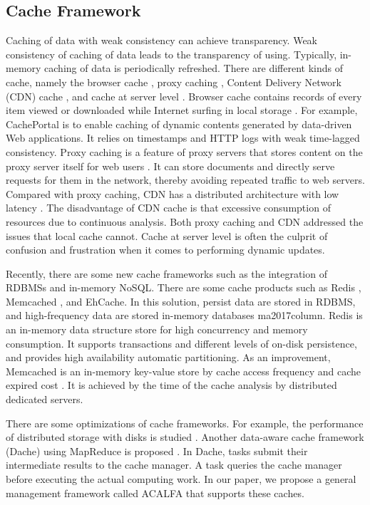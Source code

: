 \documentclass{singlecol-new}
\theoremstyle{TH}{
\newtheorem{lemma}{Lemma}
\newtheorem{theorem}[lemma]{Theorem}
\newtheorem{corrolary}[lemma]{Corrolary}
\newtheorem{conjecture}[lemma]{Conjecture}
\newtheorem{proposition}[lemma]{Proposition}
\newtheorem{claim}[lemma]{Claim}
\newtheorem{stheorem}[lemma]{Wrong Theorem}
}
\theoremstyle{THrm}{
\newtheorem{definition}{Definition}[section]
\newtheorem{question}{Question}[section]
\newtheorem{remark}{Remark}
\newtheorem{scheme}{Scheme}
}
\theoremstyle{THhit}{
\newtheorem{case}{Case}[section]
}
\begin{document}
\subsection{Cache Framework}
Caching of data with weak consistency can achieve transparency. Weak consistency of caching of data leads to the transparency of using. Typically, in-memory caching of data is periodically refreshed. There are different kinds of cache, namely the browser cache \cite{davison2001web}, proxy caching \cite{kumar2008new}, Content Delivery Network (CDN) cache \cite{vakali2003content}, and cache at server level \cite{ma2017column}. Browser cache contains records of every item viewed or downloaded while Internet surfing in local storage \cite{mookerjee2002analysis}. For example, CachePortal \cite{candan2001enabling} is to enable caching of dynamic contents generated by data-driven Web applications. It relies on timestamps and HTTP logs with weak time-lagged consistency. Proxy caching is a feature of proxy servers that stores content on the proxy server itself for web users \cite{kumar2008new}. It can store documents and directly serve requests for them in the network, thereby avoiding repeated traffic to web servers. Compared with proxy caching, CDN has a distributed architecture with low latency \cite{vakali2003content}. The disadvantage of CDN cache is that excessive consumption of resources due to continuous analysis. Both proxy caching and CDN addressed the issues that local cache cannot. Cache at server level is often the culprit of confusion and frustration when it comes to performing dynamic updates.

Recently, there are some new cache frameworks such as the integration of RDBMSs and in-memory NoSQL. There are some cache products such as Redis \cite{zawodny2009redis}, Memcached \cite{hafeez2017realizing}, and EhCache. In this solution, persist data are stored in RDBMS, and high-frequency data are stored in-memory databases {ma2017column}. Redis is an in-memory data structure store for high concurrency and memory consumption. It supports transactions and different levels of on-disk persistence, and provides high availability automatic partitioning. As an improvement, Memcached is an in-memory key-value store by cache access frequency and cache expired cost \cite{nishtala2013scaling}. It is achieved by the time of the cache analysis by distributed dedicated servers.

There are some optimizations of cache frameworks. For example, the performance of distributed storage with disks is studied \cite{scheuermann1998data}. Another data-aware cache framework (Dache) using MapReduce is proposed \cite{zhao2014dache}. In Dache, tasks submit their intermediate results to the cache manager. A task queries the cache manager before executing the actual computing work. In our paper, we propose a general management framework called ACALFA that supports these caches.
\end{document}
